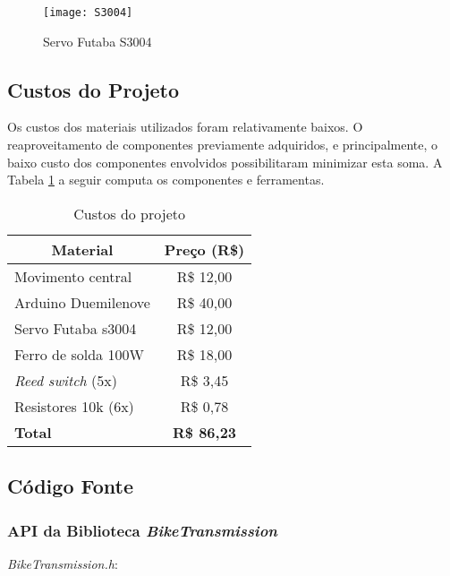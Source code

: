 \documentclass[a4paper,11pt]{article}
\begin{document}
\begin{figure}[ht]
 \begin{center}
  \texttt{[image: S3004]}
 \end{center}
 \caption{Servo Futaba S3004}
 \label{fig: servo}
\end{figure}



%
\subsection{Custos do Projeto}
\label{custos}
Os custos dos materiais utilizados foram relativamente baixos. O
reaproveitamento de componentes previamente adquiridos, e principalmente, o
baixo custo dos componentes envolvidos possibilitaram minimizar esta soma. A
Tabela \ref{tab:custos} a seguir computa os componentes e ferramentas.
{
\newcommand{\mc}[3]{\multicolumn{#1}{#2}{#3}}
\begin{table}[ht]
\begin{center}
\caption{Custos do projeto}
\label{tab:custos}
\begin{tabular}{lc}
\mc{1}{c}{\textbf{Material}} & \textbf{Preço (R\$)}\\\hline
Movimento central & R\$ 12,00\\
Arduino Duemilenove & R\$ 40,00\\
Servo Futaba s3004 & R\$ 12,00\\
Ferro de solda 100W & R\$ 18,00\\
\textit{Reed switch} (5x) & R\$ 3,45\\
Resistores 10k (6x) & R\$ 0,78\\\hline
\textbf{Total} & \textbf{R\$ 86,23}\\\hline
\end{tabular}
\end{center}
\end{table}
}



%
\subsection{Código Fonte}
\label{codigo}

\subsubsection{API da Biblioteca \textit{BikeTransmission}}
\label{code:api}
\textit{BikeTransmission.h}:

\end{document}
